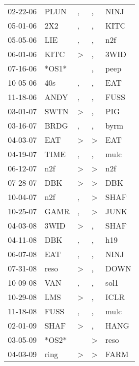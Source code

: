 \begin{supertabular}{lllll}
 02-22-06 &   PLUN &                , &             , &   NINJ \\
 05-01-06 &    2X2 &                , &             , &   KITC \\
 05-05-06 &    LIE &                , &             , &    n2f \\
 06-01-06 &   KITC &     \textgreater &             , &   3WID \\
 07-16-06 &  *OS1* &                  &             , &   peep \\
 10-05-06 &    40s &                , &             , &    EAT \\
 11-18-06 &   ANDY &                , &             , &   FUSS \\
 03-01-07 &   SWTN &     \textgreater &             , &    PIG \\
 03-16-07 &   BRDG &                , &             , &   byrm \\
 04-03-07 &    EAT &     \textgreater &  \textgreater &    EAT \\
 04-19-07 &   TIME &                , &             , &   mulc \\
 06-12-07 &    n2f &     \textgreater &  \textgreater &    n2f \\
 07-28-07 &    DBK &     \textgreater &  \textgreater &    DBK \\
 10-04-07 &    n2f &                , &  \textgreater &   SHAF \\
 10-25-07 &   GAMR &                , &  \textgreater &   JUNK \\
 04-03-08 &   3WID &     \textgreater &             , &   SHAF \\
 04-11-08 &    DBK &                , &             , &    h19 \\
 06-07-08 &    EAT &                , &             , &   NINJ \\
 07-31-08 &   reso &     \textgreater &             , &   DOWN \\
 10-09-08 &    VAN &                , &             , &   sol1 \\
 10-29-08 &    LMS &     \textgreater &             , &   ICLR \\
 11-18-08 &   FUSS &                , &             , &   mulc \\
 02-01-09 &   SHAF &     \textgreater &             , &   HANG \\
 03-05-09 &  *OS2* &                  &  \textgreater &   reso \\
 04-03-09 &   ring &     \textgreater &  \textgreater &   FARM \\

\end{supertabular}
